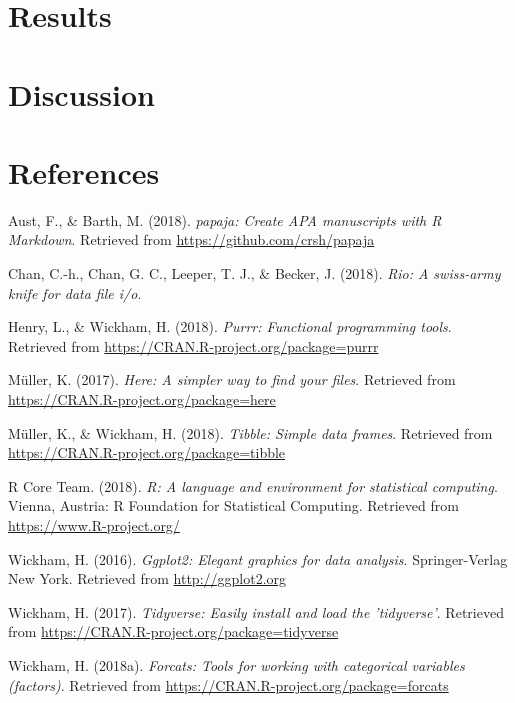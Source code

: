 \documentclass[man]{apa6}
\begin{document}
\section{Results}\label{results}

\section{Discussion}\label{discussion}

\newpage

\section{References}\label{references}

\begingroup
\setlength{\parindent}{-0.5in} \setlength{\leftskip}{0.5in}

\hypertarget{refs}{}
\hypertarget{ref-R-papaja}{}
Aust, F., \& Barth, M. (2018). \emph{papaja: Create APA manuscripts with
R Markdown}. Retrieved from \url{https://github.com/crsh/papaja}

\hypertarget{ref-R-rio}{}
Chan, C.-h., Chan, G. C., Leeper, T. J., \& Becker, J. (2018).
\emph{Rio: A swiss-army knife for data file i/o}.

\hypertarget{ref-R-purrr}{}
Henry, L., \& Wickham, H. (2018). \emph{Purrr: Functional programming
tools}. Retrieved from \url{https://CRAN.R-project.org/package=purrr}

\hypertarget{ref-R-here}{}
Müller, K. (2017). \emph{Here: A simpler way to find your files}.
Retrieved from \url{https://CRAN.R-project.org/package=here}

\hypertarget{ref-R-tibble}{}
Müller, K., \& Wickham, H. (2018). \emph{Tibble: Simple data frames}.
Retrieved from \url{https://CRAN.R-project.org/package=tibble}

\hypertarget{ref-R-base}{}
R Core Team. (2018). \emph{R: A language and environment for statistical
computing}. Vienna, Austria: R Foundation for Statistical Computing.
Retrieved from \url{https://www.R-project.org/}

\hypertarget{ref-R-ggplot2}{}
Wickham, H. (2016). \emph{Ggplot2: Elegant graphics for data analysis}.
Springer-Verlag New York. Retrieved from \url{http://ggplot2.org}

\hypertarget{ref-R-tidyverse}{}
Wickham, H. (2017). \emph{Tidyverse: Easily install and load the
'tidyverse'}. Retrieved from
\url{https://CRAN.R-project.org/package=tidyverse}

\hypertarget{ref-R-forcats}{}
Wickham, H. (2018a). \emph{Forcats: Tools for working with categorical
variables (factors)}. Retrieved from
\url{https://CRAN.R-project.org/package=forcats}
\end{document}
